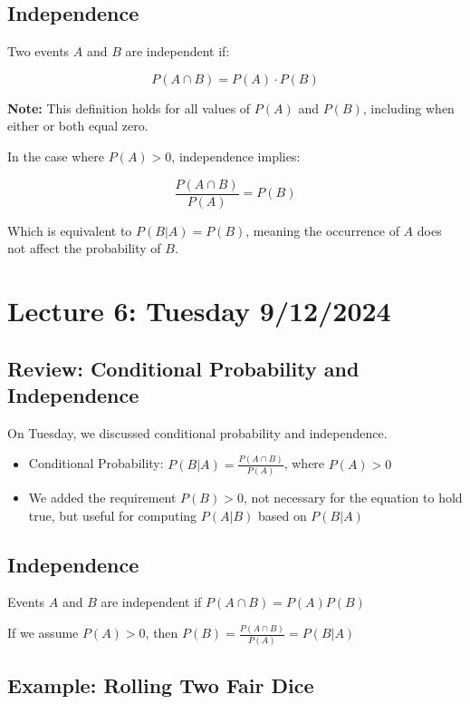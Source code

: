 \documentclass{article}
\begin{document}
    \subsection*{Independence}
    
    Two events $A$ and $B$ are independent if:
    
    \[
    P(A \cap B) = P(A) \cdot P(B)
    \]

    \textbf{Note:} This definition holds for all values of $P(A)$ and $P(B)$, including when either or both equal zero.
    
    In the case where $P(A) > 0$, independence implies:
    
    \[
    \frac{P(A \cap B)}{P(A)} = P(B)
    \]
    
    Which is equivalent to $P(B|A) = P(B)$, meaning the occurrence of $A$ does not affect the probability of $B$.
    
    \pagebreak
    
    \section*{Lecture 6: Tuesday 9/12/2024}
    
    \subsection*{Review: Conditional Probability and Independence}
    
    On Tuesday, we discussed conditional probability and independence.
    
    \begin{itemize}
        \item Conditional Probability: $P(B|A) = \frac{P(A \cap B)}{P(A)}$, where $P(A) > 0$
        \item We added the requirement $P(B) > 0$, not necessary for the equation to hold true, but useful for computing $P(A|B)$ based on $P(B|A)$
    \end{itemize}
    
    \subsection*{Independence}
    
    Events $A$ and $B$ are independent if $P(A \cap B) = P(A)P(B)$
    
    If we assume $P(A) > 0$, then $P(B) = \frac{P(A \cap B)}{P(A)} = P(B|A)$
    
    \subsection*{Example: Rolling Two Fair Dice}
    
\end{document}
